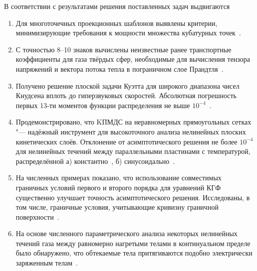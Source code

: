 В соответствии с результатами решения поставленных задач выдвигаются {}
\begin{enumerate}
    \item\label{defpos:stencils} %
    Для многоточечных проекционных шаблонов выявлены критерии,
    минимизирующие требования к мощности множества кубатурных точек~\cite{Rogozin2016}.
    \item\label{defpos:transport_coeffs} %
    С точностью 8--10 знаков вычислены неизвестные ранее транспортные коэффициенты для газа твёрдых сфер,
    необходимые для вычисления тензора напряжений и вектора потока тепла в пограничном слое Прандтля~\cite{Rogozin2016}.
    \item\label{defpos:Couette_flow} %
    Получено решение плоской задачи Куэтта для широкого диапазона чисел Кнудсена вплоть до гиперзвуковых скоростей.
    Абсолютная погрешность первых 13-ти моментов функции распределения не выше \(10^{-4}\)~\cite{Rogozin2016}.
    \item\label{defpos:asymptotic_verification} %
    Продемонстрировано, что KПМДС на неравномерных прямоугольных сетках "--- надёжный инструмент
    для высокоточного анализа нелинейных плоских кинетических слоёв. Отклонение от асимптотического
    решения не более \(10^{-4}\) для нелинейных течений между параллельными пластинами с температурой,
    распределённой а) константно~\cite{Rogozin2016}, б) синусоидально~\cite{Rogozin2017}.
    \item\label{defpos:boundary_conditions} %
    На численных примерах показано, что использование совместимых граничных условий первого и второго порядка
    для уравнений КГФ существенно улучшает точность асимптотического решения.
    Исследованы, в том числе, граничные условия, учитывающие кривизну граничной поверхности~\cite{Rogozin2017}.
    \item\label{defpos:snit_forces} %
    На основе численного параметрического анализа некоторых нелинейных течений газа
    между равномерно нагретыми телами в континуальном пределе было обнаружено,
    что обтекаемые тела притягиваются подобно электрически заряженным телам~\cite{Rogozin2014}.
\end{enumerate}

